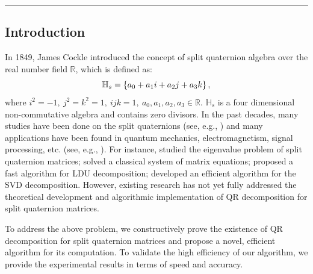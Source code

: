 \documentclass{book}
\theoremstyle{remark}
\begin{document}
\parskip=8pt
\setlength {\hangindent}{6.2em}
\noindent {}
\parskip=3pt

\noindent \rule{\textwidth}{1pt}
\parskip=0pt
\columnseprule=0pt
\setlength{\columnsep}{1.5em}
\vspace{-12pt}

\begin{multicols}{2}
\section{Introduction}
\vspace{-6pt}
In 1849, James Cockle \cite{Cockle1849} introduced the concept of split quaternion algebra over the real number field $\mathbb{R}$, which is defined as:
\begin{equation*}
    \small
    \mathbb{H}_s = \left\{ a_0 + a_1 i + a_2 j + a_3 k \right\}, 
\end{equation*} 
where $i^2 = -1,\ j^2 = k^2 = 1, \ ijk = 1, \ a_0, a_1, a_2, a_3 \in \mathbb{R}$. $\mathbb{H}_s$ is a four dimensional non-commutative algebra and contains zero divisors. In the past decades, many studies have been done on the split quaternions (see, e.g., \cite{AR2020,Yasemin2012,TJiang2015,Jiang2018,TJiang2018,Zhuo2020,Yang2020,mma2023,wang2024,Wang2021,Gang2024,yuan2017,Zhang2015}) and  many applications have been found in quantum mechanics, electromagnetism, signal processing, etc. (see, e.g., \cite{Gog2022, Hasebe2010, Le2022, Z2022, Wang2023}). For instance, \cite{Jiang2018} studied the eigenvalue problem of split quaternion matrices; \cite{wang2024} solved a classical system of matrix equations; 
 \cite{Wang2021} proposed a fast algorithm for LDU decomposition; \cite{Gang2024} developed an efficient algorithm for the SVD decomposition. However, existing research has not yet fully addressed the theoretical development and algorithmic implementation of QR decomposition for split quaternion matrices.

To address the above problem, we constructively prove the existence of QR decomposition for split quaternion matrices and propose a novel, efficient algorithm for its computation. To validate the high efficiency of our algorithm, we provide the experimental results in terms of speed and accuracy.


\end{multicols}
\end{document}
